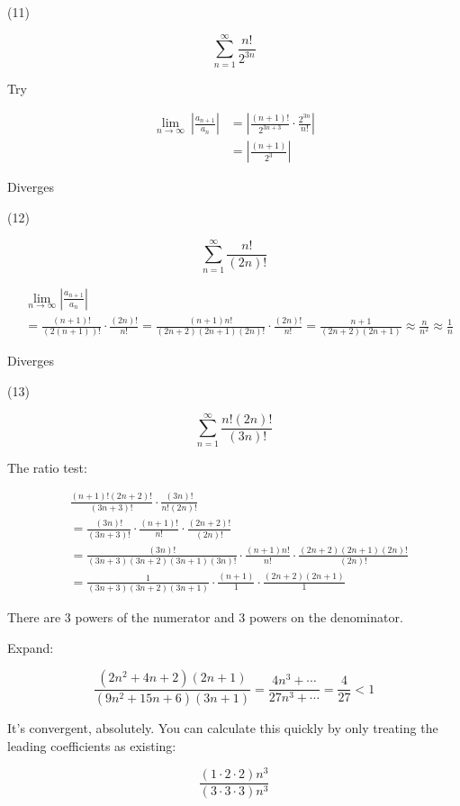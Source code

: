\documentclass[12pt]{article}
\theoremstyle{plain}
\theoremstyle{remark}
\theoremstyle{definition}
\begin{document}
(11)

\[\sum_{n = 1}^{\infty}\frac{n!}{2^{3n}}\]

Try

\begin{align*}
\lim_{n \rightarrow \infty}{\ \left| \frac{a_{n + 1}}{a_{n}} \right|} &= \left| \frac{(n + 1)!}{2^{3n + 3}} \cdot \frac{2^{3n}}{n!} \right| \\
&= \left| \frac{(n + 1)}{2^{3}} \right|
\end{align*}


Diverges

(12)

\[\sum_{n = 1}^{\infty}\frac{n!}{(2n)!}\]

\begin{align*}
&\lim_{n \rightarrow \infty}\left| \frac{a_{n + 1}}{a_{n}} \right| \\
&= \frac{(n + 1)!}{\left( 2(n + 1) \right)!} \cdot \frac{(2n)!}{n!} = \frac{(n + 1)n!}{(2n + 2)(2n + 1)(2n)!} \cdot \frac{(2n)!}{n!} = \frac{n + 1}{(2n + 2)(2n + 1)} \approx \frac{n}{n^{2}} \approx \frac{1}{n}
\end{align*}


Diverges

(13)

\[\sum_{n = 1}^{\infty}\frac{n!(2n)!}{(3n)!}\]

The ratio test:

\begin{align*}
&\frac{(n + 1)!(2n + 2)!}{(3n + 3)!} \cdot \frac{(3n)!}{n!(2n)!} \\
&= \frac{(3n)!}{(3n + 3)!} \cdot \frac{(n + 1)!}{n!} \cdot \frac{(2n + 2)!}{(2n)!} \\
&= \frac{(3n)!}{(3n + 3)(3n + 2)(3n + 1)(3n)!} \cdot \frac{(n + 1)n!}{n!} \cdot \frac{(2n + 2)(2n + 1)(2n)!}{(2n)!} \\
&= \frac{1}{(3n + 3)(3n + 2)(3n + 1)} \cdot \frac{(n + 1)}{1} \cdot \frac{(2n + 2)(2n + 1)}{1}
\end{align*}


There are 3 powers of the numerator and 3 powers on the denominator.

Expand:

\[\frac{\left( 2n^{2} + 4n + 2 \right)(2n + 1)}{\left( 9n^{2} + 15n + 6 \right)(3n + 1)} = \frac{4n^{3} + \cdots}{27n^{3} + \cdots} = \frac{4}{27} < 1\]

It's convergent, absolutely. You can calculate this quickly by only
treating the leading coefficients as existing:

\[\frac{(1 \cdot 2 \cdot 2)n^{3}}{(3 \cdot 3 \cdot 3)n^{3}}\]
\end{document}
